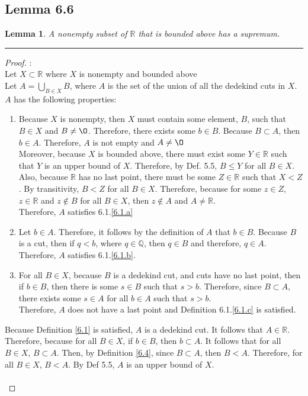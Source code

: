\documentclass[openany, amssymb, psamsfonts]{amsart}
\newcommand{\bbQ}{\mathbb{Q}}
\newcommand{\bbR}{\mathbb{R}}
\renewcommand{\emptyset}{\O}
\newtheorem{lem}{Lemma}[section]
\theoremstyle{definition}
\numberwithin{equation}{section}
\begin{document}
\subsection*{Lemma 6.6}
\begin{lem}
\label{6.6}
	A nonempty subset of $\bbR$ that is bounded above has a supremum.
\end{lem}
\vspace{4pt}     \hrule   \vspace{4pt} \begin{proof} :\\
Let $X\subset \bbR$ where $X$ is nonempty and bounded above\\  
Let $A=\bigcup_{B\in X}B$, where $A$ is the set of the union of all the dedekind cuts in $X$. $A$ has the following properties:
\begin{enumerate} [a]
\item Because $X$ is nonempty, then $X$ must contain some element, $B$, such that $B\in X$ and $B\neq \emptyset$. Therefore, there exists some $b\in B$. Because $B\subset A$, then $b\in A$. Therefore, $A$ is not empty and $A\neq \emptyset$ \\Moreover, because $X$ is bounded above, there must exist some $Y\in \bbR$ such that $Y$ is an upper bound of $X$. Therefore, by Def. 5.5, $B\leq Y$ for all $B\in X$. Also, because $\bbR$ has no last point, there must be some $Z\in \bbR$ such that $X<Z$. By transitivity, $B<Z$ for all $B\in X$. Therefore, because for some $z\in Z$, $z\in \bbR$ and $z\notin B$ for all $B\in X$, then $z\notin A$ and $A\neq \bbR$. \\Therefore, $A$ satisfies 6.1.\ref{6.1.a}
\item Let $b\in A$. Therefore, it follows by the definition of $A$ that $b\in B$. Because $B$ is a cut, then if $q<b$, where $q\in \bbQ$, then $q\in B$ and therefore, $q\in A$. \\Therefore, $A$ satisfies 6.1.\ref{6.1.b}.
\item For all $B\in X$, because $B$ is a dedekind cut, and cuts have no last point, then if $b\in B$, then there is some $s\in B$ such that $s>b$. Therefore, since $B\subset A$, there exists some $s\in A$ for all $b\in A$ such that $s>b$.\\
Therefore, $A$ does not have a last point and Definition 6.1.\ref{6.1.c} is satisfied. 
\end{enumerate} 
Because Definition \ref{6.1} is satisfied, $A$ is a dedekind cut. It follows that $A\in \bbR$. Therefore, because for all $B\in X$, if $b\in B$, then $b\subset A$. It follows that for all $B\in X$, $B\subset A$. Then, by Definition \ref{6.4}, since $B\subset A$, then $B< A$. Therefore, for all $B\in X$, $B<A$. By Def 5.5, $A$ is an upper bound of $X$. \\\\

\end{proof}
\end{document}
